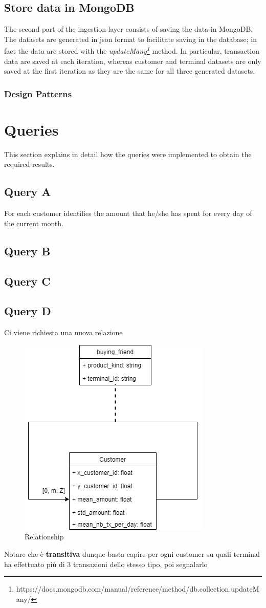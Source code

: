\documentclass[runningheads]{llncs}
\begin{document}
\subsection{Store data in MongoDB}

The second part of the ingestion layer consists of saving the data in MongoDB. The datasets are generated in json format to facilitate saving in the database; in fact the data are stored with the \emph{updateMany\footnote{https://docs.mongodb.com/manual/reference/method/db.collection.updateMany/}} method. In particular, transaction data are saved at each iteration, whereas customer and terminal datasets are only saved at the first iteration as they are the same for all three generated datasets.

\subsubsection{Design Patterns}

\section{Queries}

This section explains in detail how the queries were implemented to obtain the required results.

\subsection{Query A}

For each customer identifies the amount that he/she has spent for every day of the current month.

\subsection{Query B}
\subsection{Query C}
\subsection{Query D}
Ci viene richiesta una nuova relazione
\begin{figure}[!htb] 
        \centering \includegraphics[width=0.5\columnwidth]{images/buyingFriends.png}
        \caption{\label{fig4}Relationship}
\end{figure}
Notare che è \textbf{transitiva} dunque basta capire per ogni customer su quali terminal ha effettuato più di 3 transazioni dello stesso tipo, poi segnalarlo
\end{document}
